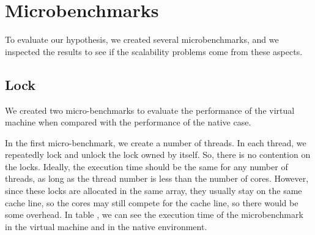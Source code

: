\section{Microbenchmarks}
To evaluate our hypothesis, we created several microbenchmarks, and we inspected the results to see if the scalability problems come from these aspects.

\subsection{Lock}
We created two micro-benchmarks to evaluate the performance of the virtual machine when compared with the performance of the native case.

In the first micro-benchmark, we create a number of threads. In each thread, we repeatedly lock and unlock the lock owned by itself. So, there is no contention on the locks. Ideally, the execution time should be the same for any number of threads, as long as the thread number is less than the number of cores.  However, since these locks are allocated in the same array, they usually stay on the same cache line, so the cores may still compete for the cache line, so there would be some overhead.
In table {\todo}, we can see the execution time of the microbenchmark in the virtual machine and in the native environment.



